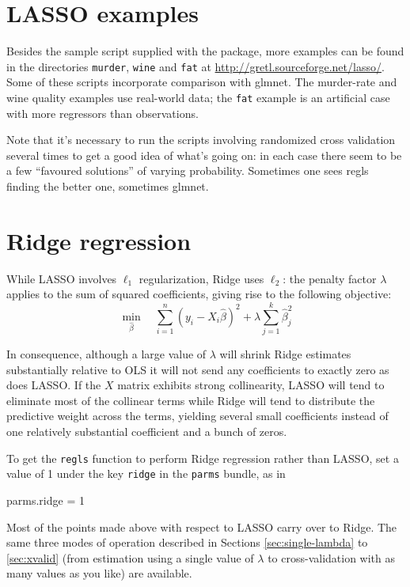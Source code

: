 \documentclass{article}
\begin{document}
\section{LASSO examples}
\label{sec:examples}

Besides the sample script supplied with the package, more examples can
be found in the directories \texttt{murder}, \texttt{wine} and
\texttt{fat} at \url{http://gretl.sourceforge.net/lasso/}.  Some of
these scripts incorporate comparison with \textsf{glmnet}.  The
murder-rate and wine quality examples use real-world data; the
\texttt{fat} example is an artificial case with more regressors than
observations.

Note that it's necessary to run the scripts involving randomized cross
validation several times to get a good idea of what's going on: in
each case there seem to be a few ``favoured solutions'' of varying
probability. Sometimes one sees \textsf{regls} finding the better one,
sometimes \textsf{glmnet}.

\section{Ridge regression}
\label{sec:ridge}

While LASSO involves $\ell_1$ regularization, Ridge uses $\ell_2$: the
penalty factor $\lambda$ applies to the sum of squared coefficients,
giving rise to the following objective:
\begin{equation}
  \label{eq:ridge-obj}
  \min_{\hat{\beta}} \quad
  \sum_{i=1}^n (y_i - X_i\hat{\beta})^2 + \lambda \sum_{j=1}^k \hat{\beta}_j^2
\end{equation}

In consequence, although a large value of $\lambda$ will shrink Ridge
estimates substantially relative to OLS it will not send any
coefficients to exactly zero as does LASSO. If the $X$ matrix exhibits
strong collinearity, LASSO will tend to eliminate most of the
collinear terms while Ridge will tend to distribute the predictive
weight across the terms, yielding several small coefficients instead
of one relatively substantial coefficient and a bunch of zeros.

To get the \texttt{regls} function to perform Ridge regression rather
than LASSO, set a value of 1 under the key \texttt{ridge} in the
\texttt{parms} bundle, as in
\begin{code}
parms.ridge = 1
\end{code}

Most of the points made above with respect to LASSO carry over to
Ridge. The same three modes of operation described in Sections
\ref{sec:single-lambda} to \ref{sec:xvalid} (from estimation using a
single value of $\lambda$ to cross-validation with as many values as
you like) are available.
\end{document}
